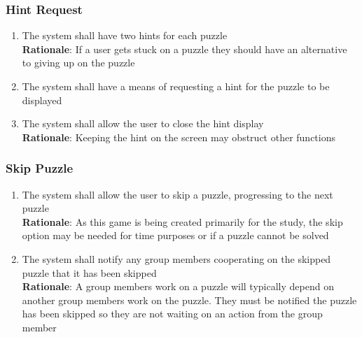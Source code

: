 \documentclass[12pt]{article}
\begin{document}
\subsubsection{Hint Request}
    \begin{enumerate}[label=HR\arabic*., series=HintRequest]
        \item The system shall have two hints for each puzzle\\
        \textbf{Rationale}: If a user gets stuck on a puzzle they should have an alternative to giving up on the puzzle
        \item The system shall have a means of requesting a hint for the puzzle to be displayed
        \item The system shall allow the user to close the hint display\\
        \textbf{Rationale}: Keeping the hint on the screen may obstruct other functions
    \end{enumerate}
\subsubsection{Skip Puzzle}
    \begin{enumerate}[label=SP\arabic*., series=SkipPuzzle]
        \item The system shall allow the user to skip a puzzle, progressing to the next puzzle\\
        \textbf{Rationale}: As this game is being created primarily for the study, the skip option may be needed for time purposes or if a puzzle cannot be solved
        \item The system shall notify any group members cooperating on the skipped puzzle that it has been skipped\\
        \textbf{Rationale}: A group members work on a puzzle will typically depend on another group members work on the puzzle. They must be notified the puzzle has been skipped so they are not waiting on an action from the group member
    \end{enumerate}
\end{document}
